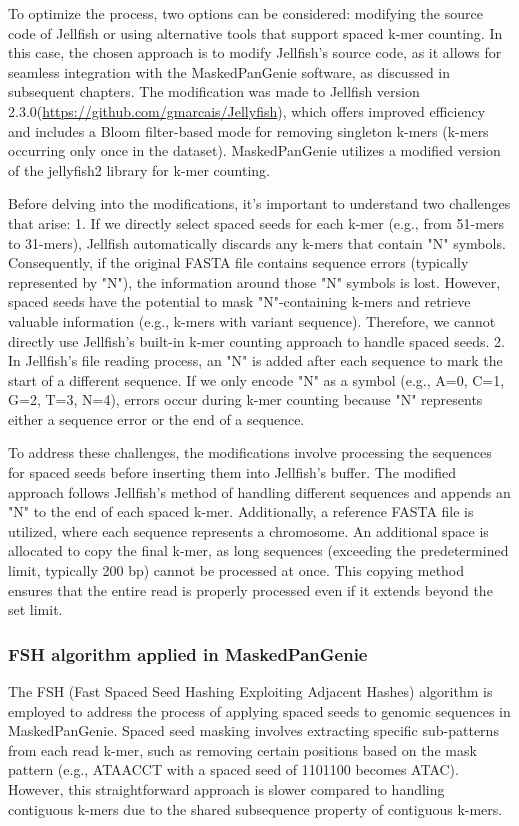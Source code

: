 \documentclass{PHlab-thesis}
\begin{document}
To optimize the process, two options can be considered: modifying the source code of Jellfish or using alternative tools that support spaced k-mer counting. In this case, the chosen approach is to modify Jellfish's source code, as it allows for seamless integration with the MaskedPanGenie software, as discussed in subsequent chapters. The modification was made to Jellfish version 2.3.0(\url{https://github.com/gmarcais/Jellyfish}), which offers improved efficiency and includes a Bloom filter-based mode for removing singleton k-mers (k-mers occurring only once in the dataset). MaskedPanGenie utilizes a modified version of the jellyfish2 library for k-mer counting.

Before delving into the modifications, it's important to understand two challenges that arise:
1. If we directly select spaced seeds for each k-mer (e.g., from 51-mers to 31-mers), Jellfish automatically discards any k-mers that contain "N" symbols. Consequently, if the original FASTA file contains sequence errors (typically represented by "N"), the information around those "N" symbols is lost. However, spaced seeds have the potential to mask "N"-containing k-mers and retrieve valuable information (e.g., k-mers with variant sequence). Therefore, we cannot directly use Jellfish's built-in k-mer counting approach to handle spaced seeds.
2. In Jellfish's file reading process, an "N" is added after each sequence to mark the start of a different sequence. If we only encode "N" as a symbol (e.g., A=0, C=1, G=2, T=3, N=4), errors occur during k-mer counting because "N" represents either a sequence error or the end of a sequence.

To address these challenges, the modifications involve processing the sequences for spaced seeds before inserting them into Jellfish's buffer. The modified approach follows Jellfish's method of handling different sequences and appends an "N" to the end of each spaced k-mer. Additionally, a reference FASTA file is utilized, where each sequence represents a chromosome. An additional space is allocated to copy the final k-mer, as long sequences (exceeding the predetermined limit, typically 200 bp) cannot be processed at once. This copying method ensures that the entire read is properly processed even if it extends beyond the set limit.
\subsubsection{FSH\cite{Girotto2018FSH} algorithm applied in MaskedPanGenie}
The FSH (Fast Spaced Seed Hashing Exploiting Adjacent Hashes) algorithm is employed to address the process of applying spaced seeds to genomic sequences in MaskedPanGenie. Spaced seed masking involves extracting specific sub-patterns from each read k-mer, such as removing certain positions based on the mask pattern (e.g., ATAACCT with a spaced seed of 1101100 becomes ATAC). However, this straightforward approach is slower compared to handling contiguous k-mers due to the shared subsequence property of contiguous k-mers.
\end{document}
